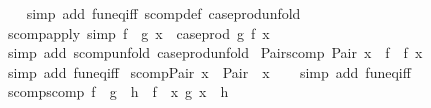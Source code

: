 \begin{isabellebody}
%
\isadelimproof
\ \ %
\endisadelimproof
%
\isatagproof
{}\isamarkupfalse%
\ {\isacharparenleft}{\kern0pt}simp\ add{\isacharcolon}{\kern0pt}\ fun{\isacharunderscore}{\kern0pt}eq{\isacharunderscore}{\kern0pt}iff\ scomp{\isacharunderscore}{\kern0pt}def\ case{\isacharunderscore}{\kern0pt}prod{\isacharunderscore}{\kern0pt}unfold{\isacharparenright}{\kern0pt}%
\endisatagproof
{\isafoldproof}%
%
\isadelimproof
\isanewline
%
\endisadelimproof
\isanewline
{}\isamarkupfalse%
\ scomp{\isacharunderscore}{\kern0pt}apply\ {\isacharbrackleft}{\kern0pt}simp{\isacharbrackright}{\kern0pt}{\isacharcolon}{\kern0pt}\ {\isachardoublequoteopen}{\isacharparenleft}{\kern0pt}f\ {\isasymcirc}{\isasymrightarrow}\ g{\isacharparenright}{\kern0pt}\ x\ {\isacharequal}{\kern0pt}\ case{\isacharunderscore}{\kern0pt}prod\ g\ {\isacharparenleft}{\kern0pt}f\ x{\isacharparenright}{\kern0pt}{\isachardoublequoteclose}\isanewline
%
\isadelimproof
\ \ %
\endisadelimproof
%
\isatagproof
{}\isamarkupfalse%
\ {\isacharparenleft}{\kern0pt}simp\ add{\isacharcolon}{\kern0pt}\ scomp{\isacharunderscore}{\kern0pt}unfold\ case{\isacharunderscore}{\kern0pt}prod{\isacharunderscore}{\kern0pt}unfold{\isacharparenright}{\kern0pt}%
\endisatagproof
{\isafoldproof}%
%
\isadelimproof
\isanewline
%
\endisadelimproof
\isanewline
{}\isamarkupfalse%
\ Pair{\isacharunderscore}{\kern0pt}scomp{\isacharcolon}{\kern0pt}\ {\isachardoublequoteopen}Pair\ x\ {\isasymcirc}{\isasymrightarrow}\ f\ {\isacharequal}{\kern0pt}\ f\ x{\isachardoublequoteclose}\isanewline
%
\isadelimproof
\ \ %
\endisadelimproof
%
\isatagproof
{}\isamarkupfalse%
\ {\isacharparenleft}{\kern0pt}simp\ add{\isacharcolon}{\kern0pt}\ fun{\isacharunderscore}{\kern0pt}eq{\isacharunderscore}{\kern0pt}iff{\isacharparenright}{\kern0pt}%
\endisatagproof
{\isafoldproof}%
%
\isadelimproof
\isanewline
%
\endisadelimproof
\isanewline
{}\isamarkupfalse%
\ scomp{\isacharunderscore}{\kern0pt}Pair{\isacharcolon}{\kern0pt}\ {\isachardoublequoteopen}x\ {\isasymcirc}{\isasymrightarrow}\ Pair\ {\isacharequal}{\kern0pt}\ x{\isachardoublequoteclose}\isanewline
%
\isadelimproof
\ \ %
\endisadelimproof
%
\isatagproof
{}\isamarkupfalse%
\ {\isacharparenleft}{\kern0pt}simp\ add{\isacharcolon}{\kern0pt}\ fun{\isacharunderscore}{\kern0pt}eq{\isacharunderscore}{\kern0pt}iff{\isacharparenright}{\kern0pt}%
\endisatagproof
{\isafoldproof}%
%
\isadelimproof
\isanewline
%
\endisadelimproof
\isanewline
{}\isamarkupfalse%
\ scomp{\isacharunderscore}{\kern0pt}scomp{\isacharcolon}{\kern0pt}\ {\isachardoublequoteopen}{\isacharparenleft}{\kern0pt}f\ {\isasymcirc}{\isasymrightarrow}\ g{\isacharparenright}{\kern0pt}\ {\isasymcirc}{\isasymrightarrow}\ h\ {\isacharequal}{\kern0pt}\ f\ {\isasymcirc}{\isasymrightarrow}\ {\isacharparenleft}{\kern0pt}{\isasymlambda}x{\isachardot}{\kern0pt}\ g\ x\ {\isasymcirc}{\isasymrightarrow}\ h{\isacharparenright}{\kern0pt}{\isachardoublequoteclose}\isanewline

\end{isabellebody}
